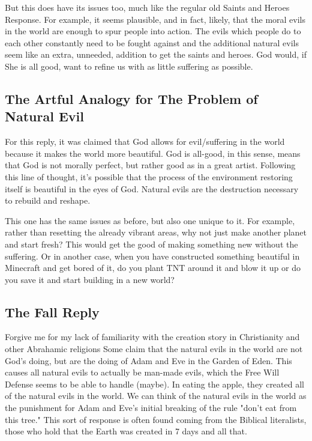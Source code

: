 But this does have its issues too, much like the regular old Saints and Heroes Response. For example, it seems plausible, and in fact, likely, that the moral evils in the world are enough to spur people into action. The evils which people do to each other constantly need to be fought against and the additional natural evils seem like an extra, unneeded, addition to get the saints and heroes. God would, if She is all good, want to refine us with as little suffering as possible. 
\subsection{The Artful Analogy for The Problem of Natural Evil} 

For this reply, it was claimed that God allows for evil/suffering in the world because it makes the world more beautiful. God is all-good, in this sense, means that God is not morally perfect, but rather good as in a great artist. Following this line of thought, it's possible that the process of the environment restoring itself is beautiful in the eyes of God. Natural evils are the destruction necessary to rebuild and reshape.

This one has the same issues as before, but also one unique to it. For example, rather than resetting the already vibrant areas, why not just make another planet and start fresh? This would get the good of making something new without the suffering. Or in another case, when you have constructed something beautiful in Minecraft and get bored of it, do you plant TNT around it and blow it up or do you save it and start building in a new world? 

\subsection{The Fall Reply}

Forgive me for my lack of familiarity with the creation story in Christianity and other Abrahamic religions Some claim that the natural evils in the world are not God’s doing, but are the doing of Adam and Eve in the Garden of Eden. This causes all natural evils to actually be man-made evils, which the Free Will Defense seems to be able to handle (maybe). In eating the apple, they created all of the natural evils in the world. We can think of the natural evils in the world as the punishment for Adam and Eve's initial breaking of the rule "don't eat from this tree." This sort of response is often found coming from the Biblical literalists, those who hold that the Earth was created in 7 days and all that. 

